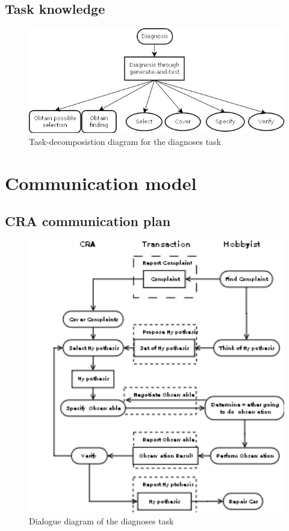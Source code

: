 \documentclass[a4paper,10pt]{article}
\begin{document}
\subsection{Task knowledge}
\begin{figure}[htbp]
	\centering
		\includegraphics[width=1.00\textwidth]{taskDecomposition.png}
	\caption{Task-decomposistion diagram for the diagnoses task}
	\label{fig:taskDecomposition}
\end{figure}



\section{Communication model}
\subsection{CRA communication plan}
\begin{figure}[htbp]
	\centering
		\includegraphics[width=1.00\textwidth]{dialogueDiagram.png}
	\caption{Dialogue diagram of the diagnoses task}
	\label{fig:dialogueDiagram}
\end{figure}
\end{document}
